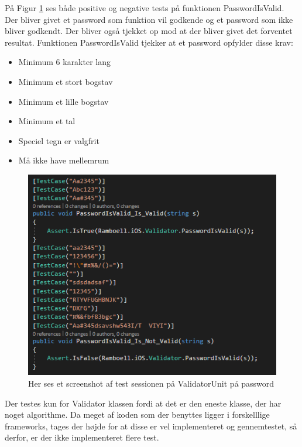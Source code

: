 På Figur \ref{fig:ValidatorUnitPassword} ses både positive og negative tests på funktionen PasswordIsValid. Der bliver givet et password som funktion vil godkende og et password som ikke bliver godkendt. Der bliver også tjekket op mod at der bliver givet det forventet resultat. Funktionen PasswordIsValid tjekker at et password opfylder disse krav: \\
\begin{itemize}
	\item Minimum 6 karakter lang
	\item Minimum et stort bogstav
	\item Minimum et lille bogstav
	\item Minimum et tal
	\item Speciel tegn er valgfrit
	\item Må ikke have mellemrum
\end{itemize}

\begin{figure}[H]
	\centering
	\includegraphics[width=0.6\linewidth]{Unit/ValidatorUnitPassword.PNG}
	\caption{Her ses et screenshot af test sessionen på ValidatorUnit på password}
	\label{fig:ValidatorUnitPassword}
\end{figure}

Der testes kun for Validator klassen fordi at det er den eneste klasse, der har noget algorithme. Da meget af koden som der benyttes ligger i forskelllige frameworks, tages der højde for at disse er vel implementeret og gennemtestet, så derfor, er der ikke implementeret flere test. 

